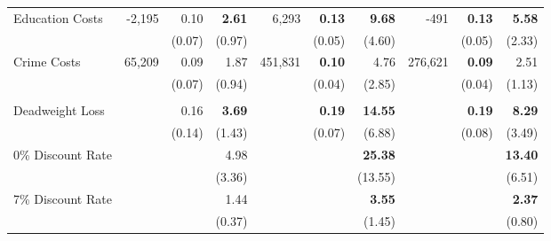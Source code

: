 \begin{tabular}{l r r r r r r r r r}
Education Costs	&	-2,195	&	0.10	&	\textbf{2.61}	&	6,293	&	\textbf{0.13}	&	\textbf{9.68}	&	-491	&	\textbf{0.13}	&	\textbf{5.58}	\\
	&		&	(0.07)	&	(0.97)	&		&	(0.05)	&	(4.60)	&		&	(0.05)	&	(2.33)	\\
Crime Costs	&	65,209	&	0.09	&	1.87	&	451,831	&	\textbf{0.10}	&	4.76	&	276,621	&	\textbf{0.09}	&	2.51	\\
	&		&	(0.07)	&	(0.94)	&		&	(0.04)	&	(2.85)	&		&	(0.04)	&	(1.13)	\\ \\
Deadweight Loss	&		&	0.16	&	\textbf{3.69}	&		&	\textbf{0.19}	&	\textbf{14.55}	&		&	\textbf{0.19}	&	\textbf{8.29}	\\
	&		&	(0.14)	&	(1.43)	&		&	(0.07)	&	(6.88)	&		&	(0.08)	&	(3.49)	\\
0\% Discount Rate	&		&		&	4.98	&		&		&	\textbf{25.38}	&		&		&	\textbf{13.40}	\\
	&		&		&	(3.36)	&		&		&	(13.55)	&		&		&	(6.51)	\\
7\% Discount Rate	&		&		&	1.44	&		&		&	\textbf{3.55}	&		&		&	\textbf{2.37}	\\
	&		&		&	(0.37)	&		&		&	(1.45)	&		&		&	(0.80)	\\
\bottomrule																			
\end{tabular}																			
